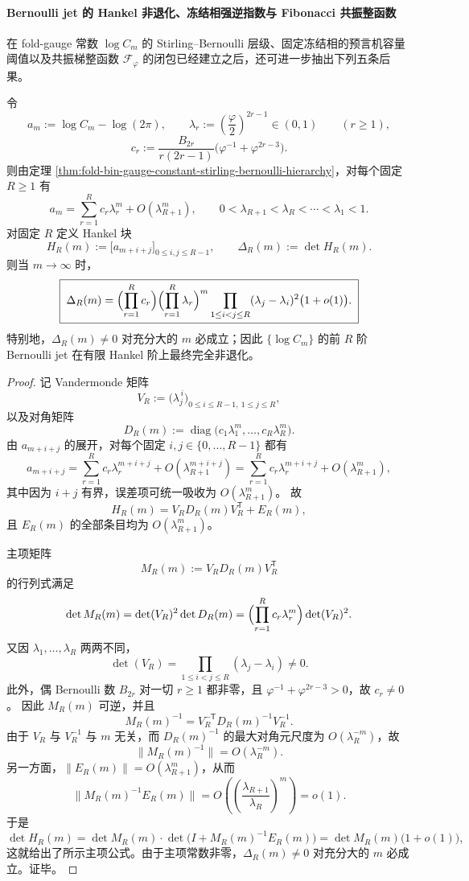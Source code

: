 \paragraph{Bernoulli jet 的 Hankel 非退化、冻结相强逆指数与 Fibonacci 共振整函数}
在 fold-gauge 常数 \(\log C_m\) 的 Stirling--Bernoulli 层级、固定冻结相的预言机容量阈值以及共振梯整函数 \(\mathcal F_\varphi\) 的闭包已经建立之后，还可进一步抽出下列五条后果。

\begin{theorem}\label{thm:xi-logcm-hankel-vandermonde-mainterm}
令
\[
a_m:=\log C_m-\log(2\pi),
\qquad
\lambda_r:=\left(\frac{\varphi}{2}\right)^{2r-1}\in(0,1)
\qquad (r\ge 1),
\]
\[
c_r:=\frac{B_{2r}}{r(2r-1)}\bigl(\varphi^{-1}+\varphi^{2r-3}\bigr).
\]
则由定理 \ref{thm:fold-bin-gauge-constant-stirling-bernoulli-hierarchy}，对每个固定 \(R\ge 1\) 有
\[
a_m=\sum_{r=1}^{R}c_r\lambda_r^m+O(\lambda_{R+1}^m),
\qquad
0<\lambda_{R+1}<\lambda_R<\cdots<\lambda_1<1.
\]
对固定 \(R\) 定义 Hankel 块
\[
H_R(m):=\bigl[a_{m+i+j}\bigr]_{0\le i,j\le R-1},
\qquad
\Delta_R(m):=\det H_R(m).
\]
则当 \(m\to\infty\) 时，
\[
\boxed{\;
\Delta_R(m)=
\Bigl(\prod_{r=1}^{R}c_r\Bigr)
\Bigl(\prod_{r=1}^{R}\lambda_r\Bigr)^m
\prod_{1\le i<j\le R}(\lambda_j-\lambda_i)^2
\bigl(1+o(1)\bigr).
\;}
\]
特别地，\(\Delta_R(m)\neq 0\) 对充分大的 \(m\) 必成立；因此 \(\{\log C_m\}\) 的前 \(R\) 阶 Bernoulli jet 在有限 Hankel 阶上最终完全非退化。
\end{theorem}
\begin{proof}
记 Vandermonde 矩阵
\[
V_R:=\bigl(\lambda_j^{\,i}\bigr)_{0\le i\le R-1,\ 1\le j\le R},
\]
以及对角矩阵
\[
D_R(m):=\operatorname{diag}\bigl(c_1\lambda_1^m,\dots,c_R\lambda_R^m\bigr).
\]
由 \(a_{m+i+j}\) 的展开，对每个固定 \(i,j\in\{0,\dots,R-1\}\) 都有
\[
a_{m+i+j}=\sum_{r=1}^{R}c_r\lambda_r^{m+i+j}+O(\lambda_{R+1}^{m+i+j})
=\sum_{r=1}^{R}c_r\lambda_r^{m+i+j}+O(\lambda_{R+1}^{m}),
\]
其中因为 \(i+j\) 有界，误差项可统一吸收为 \(O(\lambda_{R+1}^m)\)。
故
\[
H_R(m)=V_R D_R(m) V_R^{\mathsf T}+E_R(m),
\]
且 \(E_R(m)\) 的全部条目均为 \(O(\lambda_{R+1}^m)\)。

主项矩阵
\[
M_R(m):=V_R D_R(m) V_R^{\mathsf T}
\]
的行列式满足
\[
\det M_R(m)=\det(V_R)^2\det D_R(m)
=\Bigl(\prod_{r=1}^{R}c_r\lambda_r^m\Bigr)\det(V_R)^2.
\]
又因 \(\lambda_1,\dots,\lambda_R\) 两两不同，
\[
\det(V_R)=\prod_{1\le i<j\le R}(\lambda_j-\lambda_i)\neq 0.
\]
此外，偶 Bernoulli 数 \(B_{2r}\) 对一切 \(r\ge 1\) 都非零，且
\(
\varphi^{-1}+\varphi^{2r-3}>0
\)，故 \(c_r\neq 0\)。
因此 \(M_R(m)\) 可逆，并且
\[
M_R(m)^{-1}=V_R^{-\mathsf T}D_R(m)^{-1}V_R^{-1}.
\]
由于 \(V_R\) 与 \(V_R^{-1}\) 与 \(m\) 无关，而 \(D_R(m)^{-1}\) 的最大对角元尺度为 \(O(\lambda_R^{-m})\)，故
\[
\|M_R(m)^{-1}\|=O(\lambda_R^{-m}).
\]
另一方面，\(\|E_R(m)\|=O(\lambda_{R+1}^m)\)，从而
\[
\|M_R(m)^{-1}E_R(m)\|=O\!\left(\left(\frac{\lambda_{R+1}}{\lambda_R}\right)^m\right)=o(1).
\]
于是
\[
\det H_R(m)=\det M_R(m)\cdot
\det\!\bigl(I+M_R(m)^{-1}E_R(m)\bigr)
=\det M_R(m)\bigl(1+o(1)\bigr),
\]
这就给出了所示主项公式。由于主项常数非零，\(\Delta_R(m)\neq 0\) 对充分大的 \(m\) 必成立。证毕。
\end{proof}

